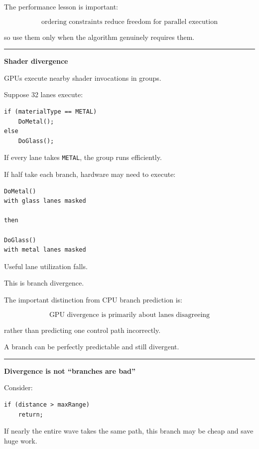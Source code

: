 The performance lesson is important:

\[
\boxed{
\text{ordering constraints reduce freedom for parallel execution}
}
\]

so use them only when the algorithm genuinely requires them.

\begin{center}\rule{0.5\linewidth}{0.5pt}\end{center}

\textbf{Shader divergence}

GPUs execute nearby shader invocations in groups.

Suppose 32 lanes execute:

\begin{verbatim}
if (materialType == METAL)
    DoMetal();
else
    DoGlass();
\end{verbatim}

If every lane takes \texttt{METAL}, the group runs efficiently.

If half take each branch, hardware may need to execute:

\begin{verbatim}
DoMetal()
with glass lanes masked

then

DoGlass()
with metal lanes masked
\end{verbatim}

Useful lane utilization falls.

This is branch divergence.

The important distinction from CPU branch prediction is:

\[
\boxed{
\text{GPU divergence is primarily about lanes disagreeing}
}
\]

rather than predicting one control path incorrectly.

A branch can be perfectly predictable and still divergent.

\begin{center}\rule{0.5\linewidth}{0.5pt}\end{center}

\textbf{Divergence is not ``branches are bad''}

Consider:

\begin{verbatim}
if (distance > maxRange)
    return;
\end{verbatim}

If nearly the entire wave takes the same path, this branch may be cheap and save huge work.

